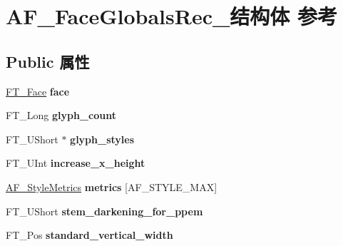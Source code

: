 \hypertarget{struct_a_f___face_globals_rec__}{}\section{A\+F\+\_\+\+Face\+Globals\+Rec\+\_\+结构体 参考}
\label{struct_a_f___face_globals_rec__}
\subsection*{Public 属性}
\begin{DoxyCompactItemize}
\item 
\mbox{\label{struct_a_f___face_globals_rec___afc6df352a8aa039ea4d6005b66b744d1}} 
\hyperlink{struct_f_t___face_rec__}{F\+T\+\_\+\+Face} {\bfseries face}
\item 
\mbox{\label{struct_a_f___face_globals_rec___a32603e7533538fb29a0077877b6bfaa5}} 
F\+T\+\_\+\+Long {\bfseries glyph\+\_\+count}
\item 
\mbox{\label{struct_a_f___face_globals_rec___a12528409e7c2c494f735e1c305b5b0a2}} 
F\+T\+\_\+\+U\+Short $\ast$ {\bfseries glyph\+\_\+styles}
\item 
\mbox{\label{struct_a_f___face_globals_rec___aadf2297c47963902c951b357ae380a96}} 
F\+T\+\_\+\+U\+Int {\bfseries increase\+\_\+x\+\_\+height}
\item 
\mbox{\label{struct_a_f___face_globals_rec___a9831112f175822cacf54f8666e6aeaec}} 
\hyperlink{struct_a_f___style_metrics_rec__}{A\+F\+\_\+\+Style\+Metrics} {\bfseries metrics} \mbox{[}A\+F\+\_\+\+S\+T\+Y\+L\+E\+\_\+\+M\+AX\mbox{]}
\item 
\mbox{\label{struct_a_f___face_globals_rec___a3d604e18ae1ec2b7abee6030c29dc064}} 
F\+T\+\_\+\+U\+Short {\bfseries stem\+\_\+darkening\+\_\+for\+\_\+ppem}
\item 
\mbox{\label{struct_a_f___face_globals_rec___aa9030b91741d22f3ebf00c72beee36c0}} 
F\+T\+\_\+\+Pos {\bfseries standard\+\_\+vertical\+\_\+width}

\end{DoxyCompactItemize}
